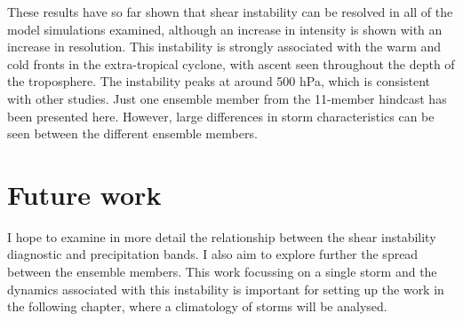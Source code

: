 %
%
%
%	




These results have so far shown that shear instability can be resolved in all of the model simulations examined, although an increase in intensity is shown with an increase in resolution. This instability is strongly associated with the warm and cold fronts in the extra-tropical cyclone, with ascent seen throughout the depth of the troposphere. The instability peaks at around 500 hPa, which is consistent with other studies. Just one ensemble member from the 11-member hindcast has been presented here. However, large differences in storm characteristics can be seen between the different ensemble members.


\section {Future work}  

I hope to examine in more detail the relationship between the shear instability diagnostic and precipitation bands. I also aim to explore further the spread between the ensemble members. This work focussing on a single storm and the dynamics associated with this instability is important for setting up the work in the following chapter, where a climatology of storms will be analysed.



